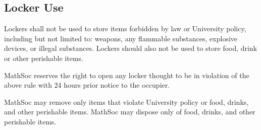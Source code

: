 \subsection{Locker Use}
Lockers shall not be used to store items forbidden by law or University policy,
including but not limited to: weapons, any flammable substances, explosive
devices, or illegal substances. Lockers should also not be used to store food,
drink or other perishable items.

MathSoc reserves the right to open any locker thought to be in violation of the
above rule with 24 hours prior notice to the occupier.

MathSoc may remove only items that violate University policy or food, drinks,
and other perishable items. MathSoc may dispose only of food, drinks, and other
perishable items.
